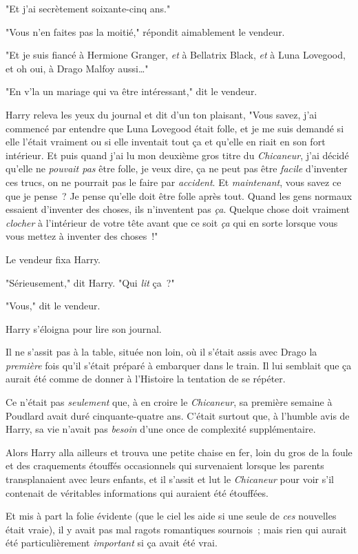 "Et j'ai secrètement soixante-cinq ans."

"Vous n'en faites pas la moitié," répondit aimablement le vendeur.

"Et je suis fiancé à Hermione Granger, \emph{et} à Bellatrix Black, \emph{et} à Luna Lovegood, et oh oui, à Drago Malfoy aussi…"

"En v'la un mariage qui va être intéressant," dit le vendeur.

Harry releva les yeux du journal et dit d'un ton plaisant, "Vous savez, j'ai commencé par entendre que Luna Lovegood était folle, et je me suis demandé si elle l'était vraiment ou si elle inventait tout ça et qu'elle en riait en son fort intérieur. Et puis quand j'ai lu mon deuxième gros titre du \emph{Chicaneur}, j'ai décidé qu'elle ne \emph{pouvait pas} être folle, je veux dire, ça ne peut pas être \emph{facile} d'inventer ces trucs, on ne pourrait pas le faire par \emph{accident}. Et \emph{maintenant}, vous savez ce que je pense~? Je pense qu'elle doit être folle après tout. Quand les gens normaux essaient d'inventer des choses, ils n'inventent pas \emph{ça}. Quelque chose doit vraiment \emph{clocher} à l'intérieur de votre tête avant que ce soit \emph{ça} qui en sorte lorsque vous vous mettez à inventer des choses~!"

Le vendeur fixa Harry.

"Sérieusement," dit Harry. "Qui \emph{lit} ça~?"

"Vous," dit le vendeur.

Harry s'éloigna pour lire son journal.

Il ne s'assit pas à la table, située non loin, où il s'était assis avec Drago la \emph{première} fois qu'il s'était préparé à embarquer dans le train. Il lui semblait que ça aurait été comme de donner à l'Histoire la tentation de se répéter.

Ce n'était pas \emph{seulement} que, à en croire le \emph{Chicaneur}, sa première semaine à Poudlard avait duré cinquante-quatre ans. C'était surtout que, à l'humble avis de Harry, sa vie n'avait pas \emph{besoin} d'une once de complexité supplémentaire.

Alors Harry alla ailleurs et trouva une petite chaise en fer, loin du gros de la foule et des craquements étouffés occasionnels qui survenaient lorsque les parents transplanaient avec leurs enfants, et il s'assit et lut le \emph{Chicaneur} pour voir s'il contenait de véritables informations qui auraient été étouffées.

Et mis à part la folie évidente (que le ciel les aide si une seule de \emph{ces} nouvelles était vraie), il y avait pas mal ragots romantiques sournois~; mais rien qui aurait été particulièrement \emph{important} si ça avait été vrai.

